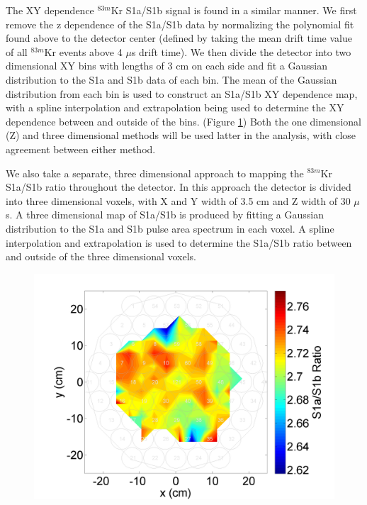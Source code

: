 The XY dependence $^{83m}$Kr S1a/S1b signal is found in a similar manner.  We first remove the z dependence of the S1a/S1b data by normalizing the polynomial fit found above to the detector center (defined by taking the mean drift time value of all $^{83m}$Kr events above 4 $\mu$s drift time). We then divide the detector into two dimensional XY bins with lengths of 3 cm on each side and fit a Gaussian distribution to the S1a and S1b data of each bin.  The mean of the Gaussian distribution from each bin is used to construct an S1a/S1b XY dependence map, with a spline interpolation and extrapolation being used to determine the XY dependence between and outside of the bins. (Figure \ref{fig:S1aS1bXYDep})  Both the one dimensional (Z) and three dimensional methods will be used latter in the analysis, with close agreement between either method.


We also take a separate, three dimensional approach to mapping the $^{83m}$Kr S1a/S1b ratio throughout the detector. In this approach the detector is divided into three dimensional voxels, with X and Y width of 3.5 cm and Z width of 30 $\mu$s.  A three dimensional map of S1a/S1b is produced by fitting a Gaussian distribution to the S1a and S1b pulse area spectrum in each voxel.  A spline interpolation and extrapolation is used to determine the S1a/S1b ratio between and outside of the three dimensional voxels.

\begin{figure}[!h]
\includegraphics[scale=0.6]{Run04Corrections/S1aS1bvXY.png}
 \label{fig:S1aS1bXYDep}
\end{figure}

